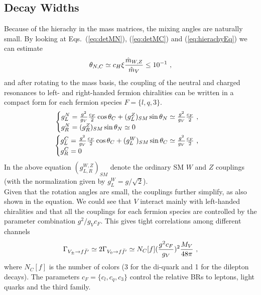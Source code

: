 \subsection*{Decay Widths}
Because of the hierachy in the mass matrices, the mixing angles are naturally small. By looking at Eqs.~(\ref{eq:detMN}), (\ref{eq:detMC}) and (\ref{eq:hierachyEq}) we can estimate
\begin{align}
  \theta_{N,C}\simeq c_{H}\xi \frac{\hat{m}_{W,Z}}{\hat{m}_{V}}\leq10^{-1}\textup{ ,}
\end{align}
and after rotating to the mass basis, the coupling of the neutral and charged resonances to left- and right-handed fermion chiralities can be written in a compact form for each fermion species $F=\{l,q,3\}$.
\begin{align}
\begin{cases}  
  g_{L}^{N}=\frac{g^{2}}{g_{V}}\frac{c_{F}}{2}\cos\theta_{C}+(g_{L}^{Z})_{SM}\sin\theta_{N}\simeq\frac{g^{2}}{g_{V}}\frac{c_{F}}{2}\textup{ ,}\\
  g_{R}^{N}=(g_{R}^{Z})_{SM}\sin\theta_{N}\simeq0
\end{cases}\nonumber\\
\begin{cases}
  g_{L}^{C}=\frac{g^{2}}{g_{V}}\frac{c_{F}}{2}\cos\theta_{C}+(g_{L}^{W})_{SM}\sin\theta_{C}\simeq\frac{g^{2}}{g_{V}}\frac{c_{F}}{2}\textup{ ,}\\
  g_{R}^{C}=0
\end{cases}
\end{align}
In the above equation $(g_{L,R}^{W,Z})_{SM}$ denote the ordinary SM $W$ and $Z$ couplings (with the normalization given by $g_{L}^{W} = g/\sqrt{2}$).\\
\newline Given that the rotation angles are small, the couplings further simplify, as also shown in the equation. We could see that $V$ interact mainly with left-handed chiralities and that all the couplings for each fermion species are controlled by the parameter combination $g^{2}/g_{V}c_{F}$. This gives tight correlations among different channels
\begin{align}
  \label{eq:DRfermion}
  \Gamma_{V_{\pm}\rightarrow f\bar{f}'}\simeq2\Gamma_{V_{0}\rightarrow f\bar{f}'}\simeq N_{C}[f](\frac{g^{2}c_{F}}{g_{V}})^{2}\frac{M_{V}}{48\pi}\textup{ ,}
\end{align}
where $N_{C}[f]$ is the number of colors (3 for the di-quark and 1 for the dilepton decays). The parameters $c_{F} = \{c_{l},c_{q},c_{3}\}$ control the relative BRs to leptons, light quarks and the third family.
